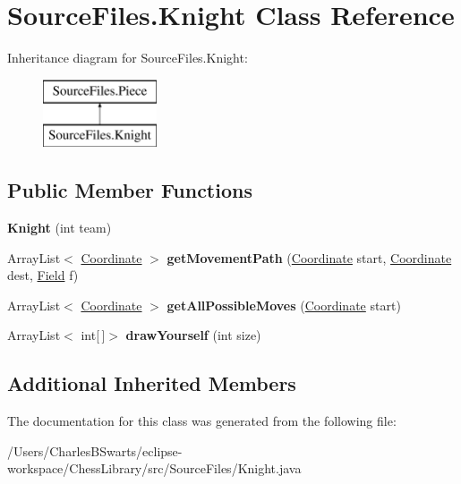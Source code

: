 \hypertarget{class_source_files_1_1_knight}{}\section{Source\+Files.\+Knight Class Reference}
\label{class_source_files_1_1_knight}
Inheritance diagram for Source\+Files.\+Knight\+:\begin{figure}[H]
\begin{center}
\leavevmode
\includegraphics[height=2.000000cm]{class_source_files_1_1_knight}
\end{center}
\end{figure}
\subsection*{Public Member Functions}
\begin{DoxyCompactItemize}
\item 
\mbox{\label{class_source_files_1_1_knight_a6cee1a1244b4e5375f9c45a9f1ad5ea3}} 
{\bfseries Knight} (int team)
\item 
\mbox{\label{class_source_files_1_1_knight_a4d4e8c303d344065929ae708f08a7872}} 
Array\+List$<$ \mbox{\hyperlink{class_source_files_1_1_coordinate}{Coordinate}} $>$ {\bfseries get\+Movement\+Path} (\mbox{\hyperlink{class_source_files_1_1_coordinate}{Coordinate}} start, \mbox{\hyperlink{class_source_files_1_1_coordinate}{Coordinate}} dest, \mbox{\hyperlink{class_source_files_1_1_field}{Field}} f)
\item 
\mbox{\label{class_source_files_1_1_knight_a6cf1a8dfefede13ab9c1fb37ceebf79b}} 
Array\+List$<$ \mbox{\hyperlink{class_source_files_1_1_coordinate}{Coordinate}} $>$ {\bfseries get\+All\+Possible\+Moves} (\mbox{\hyperlink{class_source_files_1_1_coordinate}{Coordinate}} start)
\item 
\mbox{\label{class_source_files_1_1_knight_a82830375663170285bf38b9273a8571f}} 
Array\+List$<$ int\mbox{[}$\,$\mbox{]}$>$ {\bfseries draw\+Yourself} (int size)
\end{DoxyCompactItemize}
\subsection*{Additional Inherited Members}


The documentation for this class was generated from the following file\+:\begin{DoxyCompactItemize}
\item 
/\+Users/\+Charles\+B\+Swarts/eclipse-\/workspace/\+Chess\+Library/src/\+Source\+Files/Knight.\+java\end{DoxyCompactItemize}
